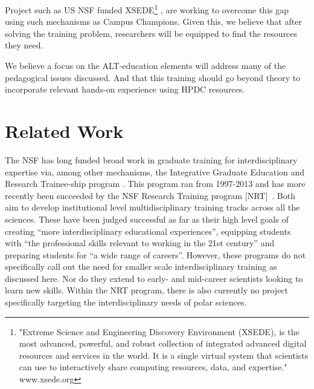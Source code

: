 \documentclass[conference]{IEEEtran}
\begin{document}
\begin{enumerate}[\setlength{\listparindent}{\parindent}]
Project such as US NSF funded XSEDE\footnote{"Extreme Science and Engineering Discovery Environment (XSEDE), is the most advanced, powerful, and robust collection of integrated advanced digital resources and services in the world. It is a single virtual system that scientists can use to interactively share computing resources, data, and expertise." www.xsede.org} \cite{noauthor_undated-lh}, are working to overcome this gap using such mechanisms as Campus Champions.  Given this, we believe that after solving the training problem, researchers will be equipped to find the resources they need. \end{enumerate} We believe a focus on the ALT-education elements will address many of the pedagogical issues discussed.  And that this training should go beyond theory to incorporate relevant hands-on experience using HPDC resources.

\section{Related Work}
The NSF has long funded broad work in graduate training for interdisciplinary expertise via, among other mechanisms, the Integrative Graduate Education and Research Trainee-ship program \cite{noauthor_undated-bu}.  This program ran from 1997-2013 and has more recently been succeeded by the NSF Research Training program [NRT]~\cite{NRT}.  Both aim to develop institutional level multidisciplinary training tracks across all the sciences. These have been judged successful as far as their high level goals of creating ``more interdisciplinary educational experiences'', equipping students with ``the professional skills relevant to working in the 21st century'' and preparing students for ``a wide range of careers''\cite{National2006}. However, these programs do not specifically call out the need for smaller scale interdisciplinary training as discussed here.  Nor do they extend to early- and mid-career scientists looking to learn new skills. Within the NRT program, there is also currently no project specifically targeting the interdisciplinary needs of polar sciences.
\end{document}
